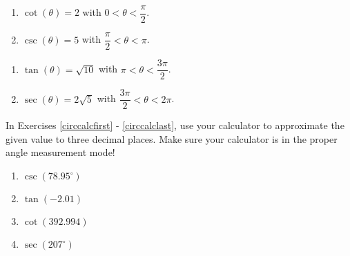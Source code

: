 \begin{multicols}{2}

\begin{enumerate}

\setcounter{enumi}{\value{HW}}

\item  $\cot(\theta) = 2$ with $0  < \theta < \dfrac{\pi}{2}$.
\item  $\csc(\theta) = 5$ with $\dfrac{\pi}{2} < \theta < \pi$.

\setcounter{HW}{\value{enumi}}

\end{enumerate}

\end{multicols}

\begin{multicols}{2}

\begin{enumerate}

\setcounter{enumi}{\value{HW}}

\item  $\tan(\theta) = \sqrt{10}$ with $\pi < \theta < \dfrac{3\pi}{2}$.
\item  $\sec(\theta) = 2\sqrt{5}$ with $\dfrac{3\pi}{2} < \theta < 2\pi$. \label{findothercirclast}

\setcounter{HW}{\value{enumi}}

\end{enumerate}

\end{multicols}

In Exercises \ref{circcalcfirst} - \ref{circcalclast}, use your calculator to approximate the given value to three decimal places.  Make sure your calculator is in the proper angle measurement mode!

\begin{multicols}{4}

\begin{enumerate}

\setcounter{enumi}{\value{HW}}

\item $\csc(78.95^{\circ})$ \label{circcalcfirst}
\item $\tan(-2.01)$
\item $\cot(392.994)$
\item $\sec(207^{\circ})$

\setcounter{HW}{\value{enumi}}

\end{enumerate}

\end{multicols}

